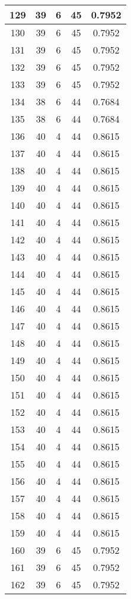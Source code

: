 \documentclass[letterpaper, 12pt]{article}
\begin{document}
\begin{longtable}{|c|c|c|c|c|}
\hline
129 & 39 & 6 & 45 & 0.7952 \\
\hline
130 & 39 & 6 & 45 & 0.7952 \\
\hline
131 & 39 & 6 & 45 & 0.7952 \\
\hline
132 & 39 & 6 & 45 & 0.7952 \\
\hline
133 & 39 & 6 & 45 & 0.7952 \\
\hline
134 & 38 & 6 & 44 & 0.7684 \\
\hline
135 & 38 & 6 & 44 & 0.7684 \\
\hline
136 & 40 & 4 & 44 & 0.8615 \\
\hline
137 & 40 & 4 & 44 & 0.8615 \\
\hline
138 & 40 & 4 & 44 & 0.8615 \\
\hline
139 & 40 & 4 & 44 & 0.8615 \\
\hline
140 & 40 & 4 & 44 & 0.8615 \\
\hline
141 & 40 & 4 & 44 & 0.8615 \\
\hline
142 & 40 & 4 & 44 & 0.8615 \\
\hline
143 & 40 & 4 & 44 & 0.8615 \\
\hline
144 & 40 & 4 & 44 & 0.8615 \\
\hline
145 & 40 & 4 & 44 & 0.8615 \\
\hline
146 & 40 & 4 & 44 & 0.8615 \\
\hline
147 & 40 & 4 & 44 & 0.8615 \\
\hline
148 & 40 & 4 & 44 & 0.8615 \\
\hline
149 & 40 & 4 & 44 & 0.8615 \\
\hline
150 & 40 & 4 & 44 & 0.8615 \\
\hline
151 & 40 & 4 & 44 & 0.8615 \\
\hline
152 & 40 & 4 & 44 & 0.8615 \\
\hline
153 & 40 & 4 & 44 & 0.8615 \\
\hline
154 & 40 & 4 & 44 & 0.8615 \\
\hline
155 & 40 & 4 & 44 & 0.8615 \\
\hline
156 & 40 & 4 & 44 & 0.8615 \\
\hline
157 & 40 & 4 & 44 & 0.8615 \\
\hline
158 & 40 & 4 & 44 & 0.8615 \\
\hline
159 & 40 & 4 & 44 & 0.8615 \\
\hline
160 & 39 & 6 & 45 & 0.7952 \\
\hline
161 & 39 & 6 & 45 & 0.7952 \\
\hline
162 & 39 & 6 & 45 & 0.7952 \\

\end{longtable}
\end{document}
